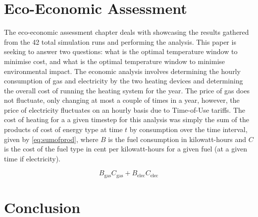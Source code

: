 \section{Eco-Economic Assessment}\label{sec:methodecoeco}
The eco-economic assessment chapter deals with showcasing the results gathered from the 42 total simulation runs and performing the analysis. This paper is seeking to answer two questions: what is the optimal temperature window to minimise cost, and what is the optimal temperature window to minimise environmental impact. The economic analysis involves determining the hourly consumption of gas and electricity by the two heating devices and determining the overall cost of running the heating system for the year. The price of gas does not fluctuate, only changing at most a couple of times in a year, however, the price of electricity fluctuates on an hourly basis due to Time-of-Use tariffs. The cost of heating for a a given timestep for this analysis was simply the sum of the products of cost of energy type at time $t$ by consumption over the time interval, given by \cref{eq:sumofprod}, where $B$ is the fuel consumption in kilowatt-hours and $C$ is the cost of the fuel type in cent per kilowatt-hours for a given fuel (at a given time if electricity).


\begin{equation}
    B_\text{gas}C_\text{gas} + B_\text{elec}C_\text{elec}\label{eq:sumofprod}
\end{equation}


\section{Conclusion}\label{sec:methodconclusion}


